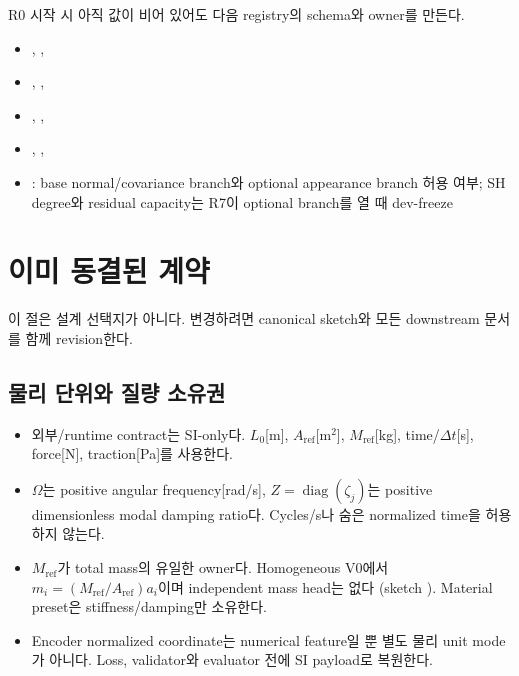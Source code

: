 \documentclass[10pt]{article}
\begin{document}
R0 시작 시 아직 값이 비어 있어도 다음 registry의 schema와 owner를 만든다.
\begin{itemize}
  \item {}, , 
  \item {}, , 
  \item {}, , 
  \item {}, , 
  \item {}: base normal/covariance branch와 optional appearance branch 허용 여부;
  SH degree와 residual capacity는 R7이 optional branch를 열 때 dev-freeze
\end{itemize}

\section{이미 동결된 계약}
\label{sec:r0-chapter-3}

이 절은 설계 선택지가 아니다. 변경하려면 canonical sketch와 모든 downstream 문서를 함께 revision한다.

\subsection{물리 단위와 질량 소유권}

\begin{itemize}
  \item 외부/runtime contract는 SI-only다. \(L_0\)[m], \(A_{\mathrm{ref}}\)[m\(^2\)],
  \(M_{\mathrm{ref}}\)[kg], time/\(\Delta t\)[s], force[N], traction[Pa]를 사용한다.
  \item \(\Omega\)는 positive angular frequency[rad/s], \(Z=\operatorname{diag}(\zeta_j)\)는
  positive dimensionless modal damping ratio다. Cycles/s나 숨은 normalized time을 허용하지 않는다.
  \item \(M_{\mathrm{ref}}\)가 total mass의 유일한 owner다. Homogeneous V0에서
  \(m_i=(M_{\mathrm{ref}}/A_{\mathrm{ref}})a_i\)이며 independent mass head는 없다
  (sketch ). Material preset은 stiffness/damping만 소유한다.
  \item Encoder normalized coordinate는 numerical feature일 뿐 별도 물리 unit mode가 아니다.
  Loss, validator와 evaluator 전에 SI payload로 복원한다.
\end{itemize}
\end{document}
